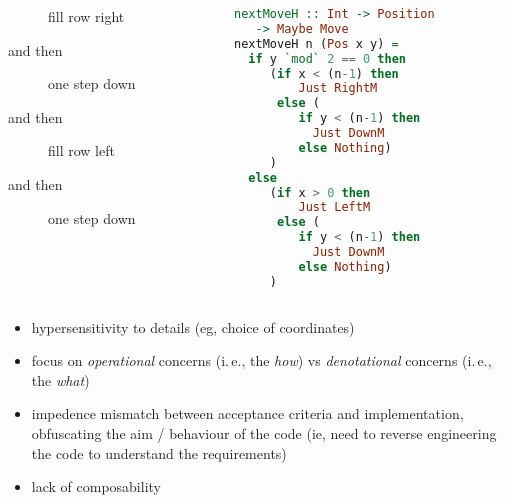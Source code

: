 \documentclass[10pt]{beamer}
\providecommand{\ie}{i.\,e.}
\begin{document}
\begin{frame}[fragile]
  \begin{columns}%
\begin{column}{0.5\textwidth}
      \begin{description}
      \item[] fill row right
      \item[and then] one step down
      \item[and then] fill row left
      \item[and then] one step down
  \end{description}
        \end{column}
            \vrule{}
        \begin{column}{0.5\textwidth}
\begin{lstlisting}[language=haskell, basicstyle=\ttfamily\footnotesize]
nextMoveH :: Int -> Position
   -> Maybe Move
nextMoveH n (Pos x y) =
  if y `mod` 2 == 0 then
     (if x < (n-1) then
         Just RightM
      else (
         if y < (n-1) then
           Just DownM
         else Nothing)
     )
  else
     (if x > 0 then
         Just LeftM
      else (
         if y < (n-1) then
           Just DownM
         else Nothing)
     )
  \end{lstlisting}
        \end{column}
            \end{columns}
\end{frame}

\begin{frame}[fragile]
\begin{itemize}
  \item hypersensitivity to details (eg, choice of coordinates)
  \item focus on \emph{operational} concerns (\ie, the \emph{how}) vs \emph{denotational} concerns (\ie, the \emph{what})
  \item impedence mismatch between acceptance criteria and implementation, obfuscating the aim / behaviour of the code (ie, need to reverse engineering the code to understand the requirements)
  \item lack of composability

\end{itemize}
\end{frame}
\end{document}
